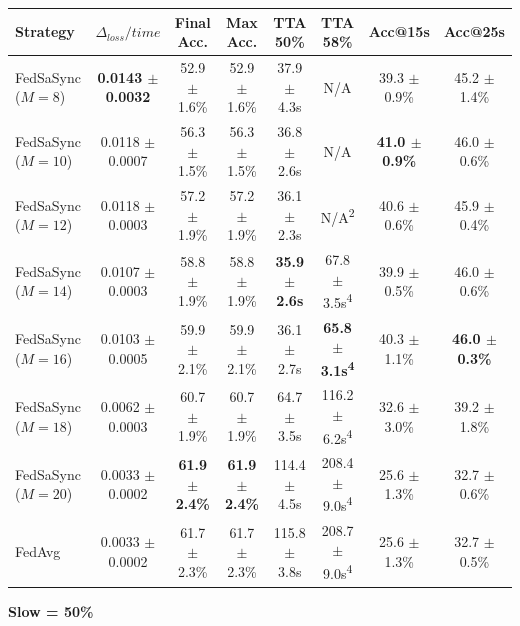\begin{table}[t]
{\begin{tabular}{lccccccc}
\hline
Strategy & $\Delta_{loss}/time$ & Final Acc. & Max Acc. & TTA 50\% & TTA 58\% & Acc@15s & Acc@25s \\
\hline
FedSaSync ($M = 8$) & \textbf{0.0143 $\pm$ 0.0032} & 52.9 $\pm$ 1.6\% & 52.9 $\pm$ 1.6\% & 37.9 $\pm$ 4.3s & N/A & 39.3 $\pm$ 0.9\% & 45.2 $\pm$ 1.4\% \\
FedSaSync ($M = 10$) & 0.0118 $\pm$ 0.0007 & 56.3 $\pm$ 1.5\% & 56.3 $\pm$ 1.5\% & 36.8 $\pm$ 2.6s & N/A & \textbf{41.0 $\pm$ 0.9\%} & 46.0 $\pm$ 0.6\% \\
FedSaSync ($M = 12$) & 0.0118 $\pm$ 0.0003 & 57.2 $\pm$ 1.9\% & 57.2 $\pm$ 1.9\% & 36.1 $\pm$ 2.3s & N/A\textsuperscript{2} & 40.6 $\pm$ 0.6\% & 45.9 $\pm$ 0.4\% \\
FedSaSync ($M = 14$) & 0.0107 $\pm$ 0.0003 & 58.8 $\pm$ 1.9\% & 58.8 $\pm$ 1.9\% & \textbf{35.9 $\pm$ 2.6s} & 67.8 $\pm$ 3.5s\textsuperscript{4} & 39.9 $\pm$ 0.5\% & 46.0 $\pm$ 0.6\% \\
FedSaSync ($M = 16$) & 0.0103 $\pm$ 0.0005 & 59.9 $\pm$ 2.1\% & 59.9 $\pm$ 2.1\% & 36.1 $\pm$ 2.7s & \textbf{65.8 $\pm$ 3.1s\textsuperscript{4}} & 40.3 $\pm$ 1.1\% & \textbf{46.0 $\pm$ 0.3\%} \\
FedSaSync ($M = 18$) & 0.0062 $\pm$ 0.0003 & 60.7 $\pm$ 1.9\% & 60.7 $\pm$ 1.9\% & 64.7 $\pm$ 3.5s & 116.2 $\pm$ 6.2s\textsuperscript{4} & 32.6 $\pm$ 3.0\% & 39.2 $\pm$ 1.8\% \\
FedSaSync ($M = 20$) & 0.0033 $\pm$ 0.0002 & \textbf{61.9 $\pm$ 2.4\%} & \textbf{61.9 $\pm$ 2.4\%} & 114.4 $\pm$ 4.5s & 208.4 $\pm$ 9.0s\textsuperscript{4} & 25.6 $\pm$ 1.3\% & 32.7 $\pm$ 0.6\% \\
FedAvg & 0.0033 $\pm$ 0.0002 & 61.7 $\pm$ 2.3\% & 61.7 $\pm$ 2.3\% & 115.8 $\pm$ 3.8s & 208.7 $\pm$ 9.0s\textsuperscript{4} & 25.6 $\pm$ 1.3\% & 32.7 $\pm$ 0.5\% \\
\hline
\end{tabular}%
}
\par\vspace{0.8em}
\noindent\textbf{Slow = 50\%} \\[0.2em]
\end{table}
